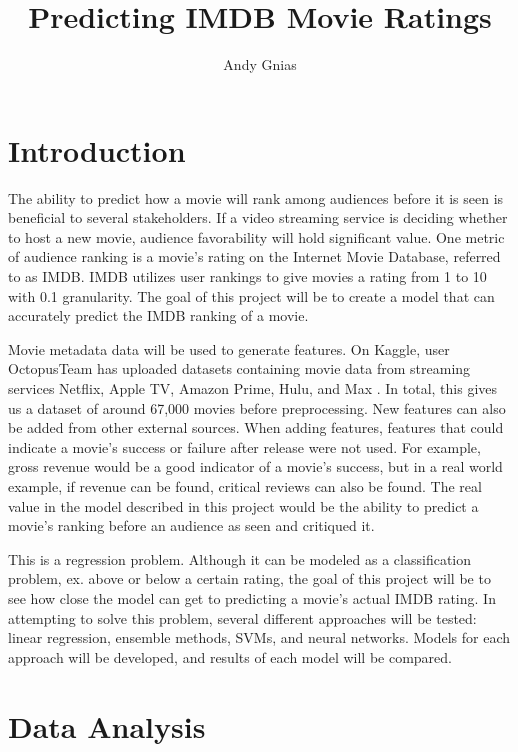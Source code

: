 \documentclass[11pt,letterpaper,oneside,titlepage]{article}
\title{Predicting IMDB Movie Ratings}
\author{Andy Gnias}
\begin{document}
\maketitle

\section{Introduction}

The ability to predict how a movie will rank among audiences before it is seen is beneficial to several stakeholders. If a video streaming service is deciding whether to host a new movie, audience favorability will hold significant value. One metric of audience ranking is a movie's rating on the Internet Movie Database, referred to as IMDB. IMDB utilizes user rankings to give movies a rating from 1 to 10 with 0.1 granularity. The goal of this project will be to create a model that can accurately predict the IMDB ranking of a movie.

Movie metadata data will be used to generate features. On Kaggle, user OctopusTeam has uploaded datasets containing movie data from streaming services Netflix, Apple TV, Amazon Prime, Hulu, and Max \cite{OctopusTeam_2024}. In total, this gives us a dataset of around 67,000 movies before preprocessing. New features can also be added from other external sources. When adding features, features that could indicate a movie's success or failure after release were not used. For example, gross revenue would be a good indicator of a movie's success, but in a real world example, if revenue can be found, critical reviews can also be found. The real value in the model described in this project would be the ability to predict a movie's ranking before an audience as seen and critiqued it.

This is a regression problem. Although it can be modeled as a classification problem, ex. above or below a certain rating, the goal of this project will be to see how close the model can get to predicting a movie's actual IMDB rating. In attempting to solve this problem, several different approaches will be tested: linear regression, ensemble methods, SVMs, and neural networks. Models for each approach will be developed, and results of each model will be compared.

\section{Data Analysis}
\end{document}
